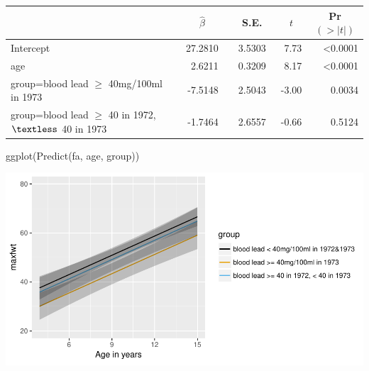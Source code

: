  \setlongtables\begin{longtable}{lrrrr}\hline
 \multicolumn{1}{l}{}&\multicolumn{1}{c}{$\hat{\beta}$}&\multicolumn{1}{c}{S.E.}&\multicolumn{1}{c}{$t$}&\multicolumn{1}{c}{Pr$(>|t|)$}\tabularnewline
 \hline
 \endhead
 \hline
 \endfoot
 Intercept&~27.2810~&~3.5303~& 7.73&\textless 0.0001\tabularnewline
 age&~ 2.6211~&~0.3209~& 8.17&\textless 0.0001\tabularnewline
 group=blood lead $\geq$ 40mg/100ml in 1973&~-7.5148~&~2.5043~&-3.00&0.0034\tabularnewline
 group=blood lead $\geq$ 40 in 1972, $\textless $ 40 in 1973&~-1.7464~&~2.6557~&-0.66&0.5124\tabularnewline
 \hline
 \end{longtable}
 \addtocounter{table}{-1}
\begin{Sinput}
ggplot(Predict(fa, age, group))
\end{Sinput}


\centerline{\includegraphics[width=\maxwidth]{reg-leadgrage-1} }


